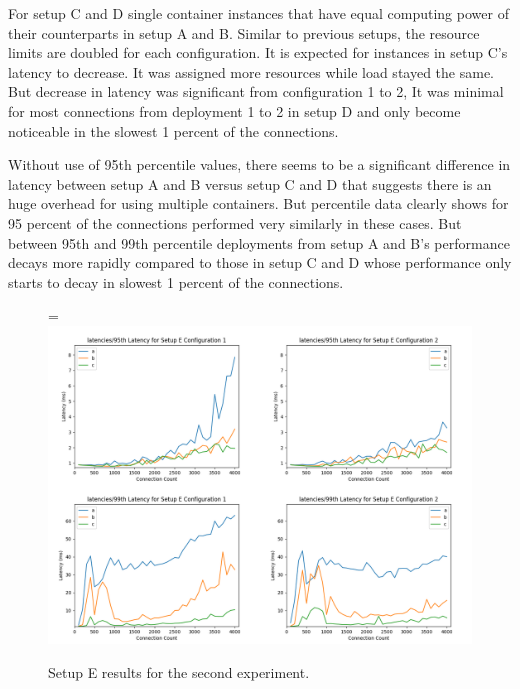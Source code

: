 \documentclass[12pt,oneandhalf,chaparabic,ceng,ms,eng,oneside,pntc]{gsufbe}
\makeatletter
\let\old@includegraphics\includegraphics
\renewcommand{\includegraphics}[2][,]{%
  \setbox9=\hbox{\old@includegraphics[#1]{#2}}%
  \ifdim\wd9>\textwidth
    \old@includegraphics[#1,width=\textwidth]{#2}%
  \else
    \old@includegraphics[#1]{#2}%
  \fi%
}
\makeatother
\begin{document}
For setup C and D single container instances that have equal computing power of their counterparts in
setup A and B. Similar to previous setups, the resource limits are doubled for each configuration.
It is expected for instances in setup C's latency to decrease. It was assigned more resources while
load stayed the same. But decrease in latency was significant from configuration 1 to 2, It was minimal
for most connections from deployment 1 to 2 in setup D and only become noticeable in the slowest 1
percent of the connections.

Without use of 95th percentile values, there seems to be a significant difference in latency between
setup A and B versus
setup C and D that suggests there is an huge overhead for using multiple containers. But percentile data
clearly shows for 95 percent of the connections performed very similarly in these cases.
But between 95th and 99th percentile deployments from setup A and B's performance decays more rapidly
compared to those in setup C and D whose performance only starts to decay in slowest 1 percent of the
connections.


\begin{figure}
\centering
\includegraphics[]{setupe.png}
\caption{Setup E results for the second experiment.}
\label{fig:setupe}
\end{figure}
\end{document}
